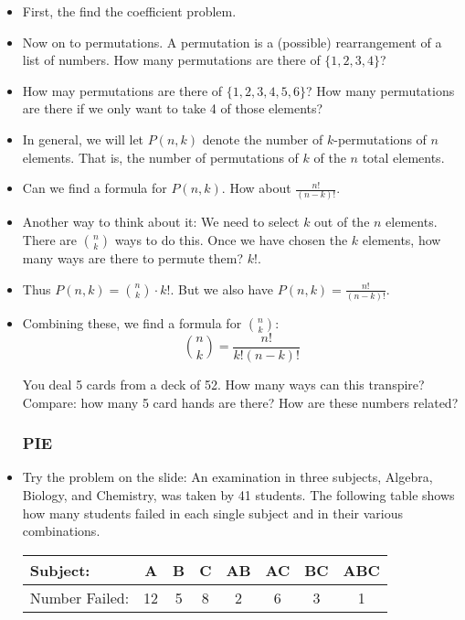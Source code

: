 \begin{itemize}


\item First, the find the coefficient problem.

\item Now on to permutations.  A permutation is a (possible) rearrangement of a list of numbers.  How many permutations are there of $\{1,2,3,4\}$?

\item How may permutations are there of $\{1,2,3,4,5,6\}$?  How many permutations are there if we only want to take 4 of those elements?

\item In general, we will let $P(n,k)$ denote the number of $k$-permutations of $n$ elements.  That is, the number of permutations of $k$ of the $n$ total elements.

\item Can we find a formula for $P(n,k)$.  How about $\frac{n!}{(n-k)!}$.  

\item Another way to think about it: We need to select $k$ out of the $n$ elements.  There are ${n \choose k}$ ways to do this.  Once we have chosen the $k$ elements, how many ways are there to permute them?  $k!$.  

\item Thus $P(n,k) = {n \choose k}\cdot k!$.  But we also have $P(n,k) = \frac{n!}{(n-k)!}$.

\item Combining these, we find a formula for ${n \choose k}$:
\[{n\choose k} = \frac{n!}{k!(n-k)!}\]

\ex You deal 5 cards from a deck of 52.  How many ways can this transpire?  Compare: how many 5 card hands are there?  How are these numbers related?

\subsubsection*{PIE}

\item Try the problem on the slide: An examination in three subjects, Algebra, Biology, and Chemistry, was taken
by 41 students. The following table shows how many students failed in each
single subject and in their various combinations.
\begin{center}
\begin{tabular}{|l|c|c|c|c|c|c|c|}
\hline
 Subject: & A & B & C & AB & AC & BC & ABC\\
\hline
Number Failed: & 12 & 5 & 8 & 2 & 6 & 3 & 1\\
\hline
\end{tabular}
\end{center}


\end{itemize}
